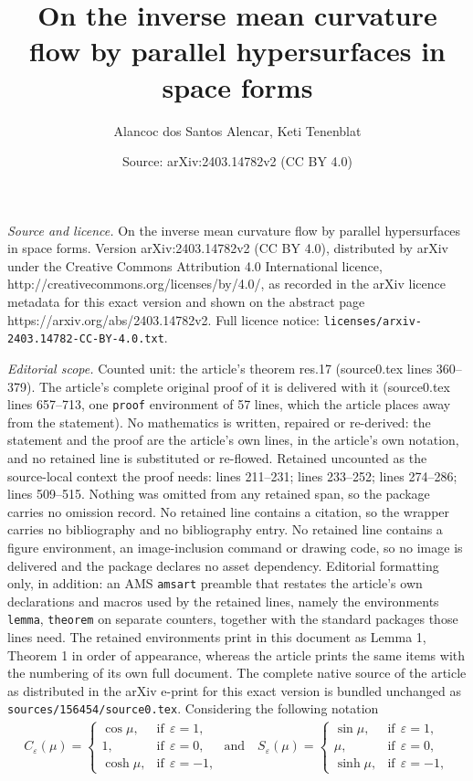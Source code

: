 \documentclass[10pt,a4paper]{amsart}
\title{On the inverse mean curvature flow by parallel hypersurfaces in space forms}
\author{Alancoc dos Santos Alencar, Keti Tenenblat}
\date{Source: arXiv:2403.14782v2 (CC BY 4.0)}
\begin{document}
\maketitle

\noindent\emph{Source and licence.} On the inverse mean curvature flow by parallel hypersurfaces in space forms. Version arXiv:2403.14782v2 (CC BY 4.0), distributed by arXiv under the Creative Commons Attribution 4.0 International licence, http://creativecommons.org/licenses/by/4.0/, as recorded in the arXiv licence metadata for this exact version and shown on the abstract page https://arxiv.org/abs/2403.14782v2. Full licence notice: \texttt{licenses/arxiv-2403.14782-CC-BY-4.0.txt}.\par\smallskip

\noindent\textit{Editorial scope.} Counted unit: the article's theorem res.17 (source0.tex lines 360--379). The article's complete original proof of it is delivered with it (source0.tex lines 657--713, one \texttt{proof} environment of 57 lines, which the article places away from the statement). No mathematics is written, repaired or re-derived: the statement and the proof are the article's own lines, in the article's own notation, and no retained line is substituted or re-flowed.  Retained uncounted as the source-local context the proof needs: lines 211--231; lines 233--252; lines 274--286; lines 509--515.  Nothing was omitted from any retained span, so the package carries no omission record.  No retained line contains a citation, so the wrapper carries no bibliography and no bibliography entry.  No retained line contains a figure environment, an image-inclusion command or drawing code, so no image is delivered and the package declares no asset dependency.  Editorial formatting only, in addition: an AMS \texttt{amsart} preamble that restates the article's own declarations and macros used by the retained lines, namely the environments \texttt{lemma}, \texttt{theorem} on separate counters, together with the standard packages those lines need.  The retained environments print in this document as Lemma 1, Theorem 1 in order of appearance, whereas the article prints the same items with the numbering of its own full document.  The complete native source of the article as distributed in the arXiv e-print for this exact version is bundled unchanged as \texttt{sources/156454/source0.tex}.
Considering the following notation
\begin{eqnarray}\label{eq.p3}
C_{\varepsilon}(\mu)= \left\{\begin{array}{ll}
\cos \mu,	& \mbox{if} ~~ \varepsilon = 1, \\ 
1,	& \mbox{if} ~~ \varepsilon = 0, \\
\cosh \mu,	& \mbox{if} ~~ \varepsilon = -1,
\end{array} 
\right. 
\mbox{ and ~~} 
S_{\varepsilon}(\mu)= \left\{\begin{array}{ll}
\sin \mu,	& \mbox{if} ~~ \varepsilon = 1, \\ 
\mu,	& \mbox{if} ~~ \varepsilon = 0, \\
\sinh \mu,	& \mbox{if} ~~ \varepsilon = -1, 
\end{array} 
\right.  
\end{eqnarray}
\end{document}

